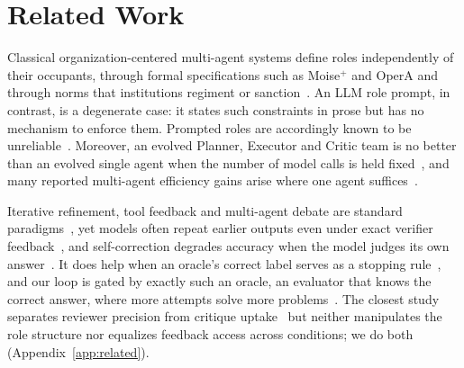 \section{Related Work}
\label{sec:related}

Classical organization-centered multi-agent systems define roles
independently of their occupants, through formal specifications such as
Moise$^+$ and OperA and through norms that institutions regiment or
sanction~\cite{hubner2002moise,dignum2004opera,esteva2001formal,grossi2007ubilex}.
An LLM role prompt, in contrast, is a degenerate case: it states such
constraints in prose but has no mechanism to enforce them. Prompted roles
are accordingly known to be unreliable~\cite{cemri2025why,orogat2026architectural}.
Moreover, an evolved Planner, Executor and Critic team is no better than an
evolved single agent when the number of model calls is held
fixed~\cite{dylan2026equal}, and many reported multi-agent efficiency gains
arise where one agent suffices~\cite{zhang2026rethinking}.

Iterative refinement, tool feedback and multi-agent debate are standard
paradigms~\cite{madaan2023selfrefine,gou2024critic,du2024debate}, yet models
often repeat earlier outputs even under exact verifier
feedback~\cite{jiang2026exactfeedback}, and self-correction degrades
accuracy when the model judges its own answer~\cite{huang2024selfcorrect}.
It does help when an oracle's correct label
serves as a stopping rule~\cite{huang2024selfcorrect}, and our loop is
gated by exactly such an oracle, an evaluator that knows the correct
answer, where more attempts solve more problems~\cite{brown2024monkeys}. The closest study separates reviewer
precision from critique uptake~\cite{yang2026precise} but neither
manipulates the role structure nor equalizes feedback access across
conditions; we do both (Appendix~\ref{app:related}).
